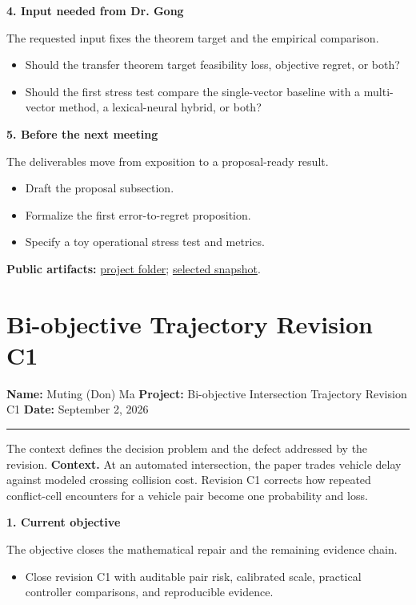 \documentclass[10pt]{article}
\newcommand{\updatehead}[2]{%
  \vspace{0.22em}\noindent\textbf{\textcolor{uablue}{#1. #2}}\par\vspace{0.04em}}
\newcommand{\projectline}[1]{%
  {\small\noindent\textbf{Name:} Muting (Don) Ma\hfill
    \textbf{Project:} #1\hfill
    \textbf{Date:} September 2, 2026\par}
  \vspace{0.18em}\hrule\vspace{0.42em}}
\newenvironment{tightitems}{%
  \begin{itemize}[leftmargin=1.15em,label=\textcolor{uablue}{\scriptsize$\bullet$},
    topsep=0.04em,itemsep=0.08em,parsep=0pt,partopsep=0pt]}{\end{itemize}}
\newcommand{\artifact}[2]{\href{#1}{#2}}
\begin{document}
\updatehead{4}{Input needed from Dr. Gong}
\sumpara The requested input fixes the theorem target and the empirical comparison. \sumparaend
\begin{tightitems}
  \item \fin Should the transfer theorem target feasibility loss, objective regret, or both? \fine
  \item \fin Should the first stress test compare the single-vector baseline with a multi-vector method, a lexical-neural hybrid, or both? \fine
\end{tightitems}

\updatehead{5}{Before the next meeting}
\sumpara The deliverables move from exposition to a proposal-ready result. \sumparaend
\begin{tightitems}
  \item \fin Draft the proposal subsection. \fine
  \item \fin Formalize the first error-to-regret proposition. \fine
  \item \fin Specify a toy operational stress test and metrics. \fine
\end{tightitems}

\vspace{0.05em}
{\footnotesize\textbf{Public artifacts:}
\artifact{https://github.com/mutingma123/OpenProjects/tree/main/EmbeddingRetrievalLimitations}{project folder};
\artifact{https://github.com/mutingma123/OpenProjects/tree/main/EmbeddingRetrievalLimitations/Figures}{selected snapshot}.\par}

\clearpage
\section{Bi-objective Trajectory Revision C1}
\label{sec:biobj}
\projectline{Bi-objective Intersection Trajectory Revision C1}

\sumpara The context defines the decision problem and the defect addressed by the revision. \sumparaend
\noindent\textbf{Context.}
\fin At an automated intersection, the paper trades vehicle delay against modeled crossing collision cost. \fine
\fin Revision C1 corrects how repeated conflict-cell encounters for a vehicle pair become one probability and loss. \fine

\updatehead{1}{Current objective}
\sumpara The objective closes the mathematical repair and the remaining evidence chain. \sumparaend
\begin{tightitems}
  \item \fin Close revision C1 with auditable pair risk, calibrated scale, practical controller comparisons, and reproducible evidence. \fine
\end{tightitems}
\end{document}
